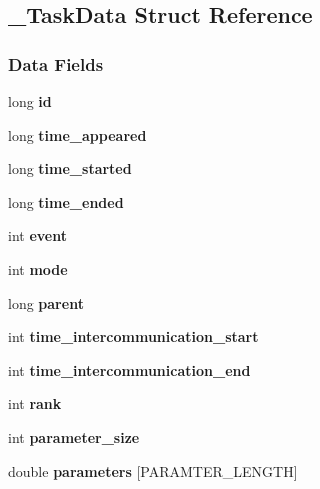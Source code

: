 \hypertarget{a00003}{}\subsection{\+\_\+\+Task\+Data Struct Reference}
\label{a00003}
\subsubsection*{Data Fields}
\begin{DoxyCompactItemize}
\item 
\hypertarget{a00003_a1ba97b263d8e2c1cba2fad32359522e5}{}long {\bfseries id}\label{a00003_a1ba97b263d8e2c1cba2fad32359522e5}

\item 
\hypertarget{a00003_af954fddad12e02dc1ba32fa44827acdf}{}long {\bfseries time\+\_\+appeared}\label{a00003_af954fddad12e02dc1ba32fa44827acdf}

\item 
\hypertarget{a00003_ab9e518445c80c9c67b60c1c69cbababb}{}long {\bfseries time\+\_\+started}\label{a00003_ab9e518445c80c9c67b60c1c69cbababb}

\item 
\hypertarget{a00003_a0bc3b4e0101f278c855489ac8b3b506d}{}long {\bfseries time\+\_\+ended}\label{a00003_a0bc3b4e0101f278c855489ac8b3b506d}

\item 
\hypertarget{a00003_ae1f49893cada58856984c697da7ff4da}{}int {\bfseries event}\label{a00003_ae1f49893cada58856984c697da7ff4da}

\item 
\hypertarget{a00003_a59a493e22491be546a2c4085525731f5}{}int {\bfseries mode}\label{a00003_a59a493e22491be546a2c4085525731f5}

\item 
\hypertarget{a00003_a3e1e21d56a1b60d3f5a8e9bee308eae3}{}long {\bfseries parent}\label{a00003_a3e1e21d56a1b60d3f5a8e9bee308eae3}

\item 
\hypertarget{a00003_adb747fb823315a3d5cd6d2837dda7acf}{}int {\bfseries time\+\_\+intercommunication\+\_\+start}\label{a00003_adb747fb823315a3d5cd6d2837dda7acf}

\item 
\hypertarget{a00003_a67f91b17345e5d837d53f13561f52d5a}{}int {\bfseries time\+\_\+intercommunication\+\_\+end}\label{a00003_a67f91b17345e5d837d53f13561f52d5a}

\item 
\hypertarget{a00003_acdd53806c2d65870377b46006e51b0f1}{}int {\bfseries rank}\label{a00003_acdd53806c2d65870377b46006e51b0f1}

\item 
\hypertarget{a00003_a9c9353c4ab3af86ea6865ad8dff936b2}{}int {\bfseries parameter\+\_\+size}\label{a00003_a9c9353c4ab3af86ea6865ad8dff936b2}

\item 
\hypertarget{a00003_a351f7ab8dbcf6fec356c0db2ded099da}{}double {\bfseries parameters} \mbox{[}P\+A\+R\+A\+M\+T\+E\+R\+\_\+\+L\+E\+N\+G\+T\+H\mbox{]}\label{a00003_a351f7ab8dbcf6fec356c0db2ded099da}

\end{DoxyCompactItemize}
